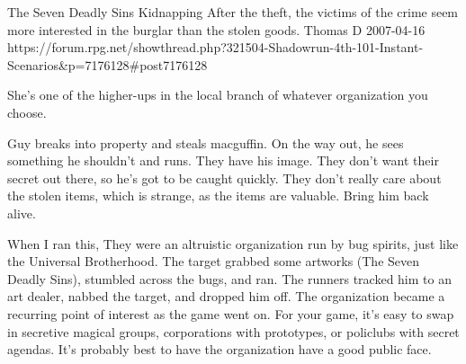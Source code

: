 \begin{scenario}{The Seven Deadly Sins}
	{Kidnapping}
	{After the theft, the victims of the crime seem more interested in the burglar than the stolen goods.}
	{Thomas D}
	{2007-04-16}
	{https://forum.rpg.net/showthread.php?321504-Shadowrun-4th-101-Instant-Scenarios\&p=7176128#post7176128}

 She's one of the higher-ups in the local branch of whatever organization you choose. 

\synopsis Guy breaks into property and steals macguffin. On the way out, he sees something he shouldn't and runs. They have his image. They don't want their secret out there, so he's got to be caught quickly. They don't really care about the stolen items, which is strange, as the items are valuable. Bring him back alive.

\notes When I ran this, They were an altruistic organization run by bug spirits, just like the Universal Brotherhood. The target grabbed some artworks (The Seven Deadly Sins), stumbled across the bugs, and ran. The runners tracked him to an art dealer, nabbed the target, and dropped him off. The organization became a recurring point of interest as the game went on. For your game, it's easy to swap in secretive magical groups, corporations with prototypes, or policlubs with secret agendas. It's probably best to have the organization have a good public face. 

\end{scenario}